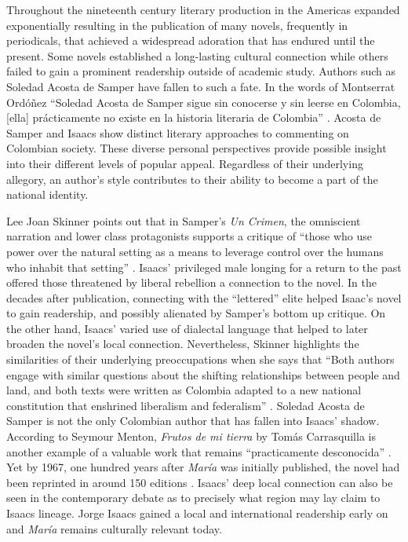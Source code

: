 \documentclass[12pt]{report}\usepackage[]{graphicx}\usepackage[]{color}
\begin{document}
\begin{spacing}{1.9}
Throughout the nineteenth century literary production in the Americas expanded exponentially resulting in the publication of many novels, frequently in periodicals, that achieved a widespread adoration that has endured until the present. 
Some novels established a long-lasting cultural connection while others failed to gain a prominent readership outside of academic study. 
Authors such as Soledad Acosta de Samper have fallen to such a fate. 
In the words of Montserrat Ordóñez \enquote{Soledad Acosta de Samper sigue sin conocerse y sin leerse en Colombia, [ella] prácticamente no existe en la historia literaria de Colombia} \autocite[257]{Ordonez2005}. 
Acosta de Samper and Isaacs show distinct literary approaches to commenting on Colombian society.
These diverse personal perspectives provide possible insight into their different levels of popular appeal.
Regardless of their underlying allegory, an author’s style contributes to their ability to become a part of the national identity. 

Lee Joan Skinner points out that in Samper's \textit{Un Crimen}, the omniscient narration and lower class protagonists supports a critique of  \enquote{those who use power over the natural setting as a means to leverage control over the humans who inhabit that setting} \autocite[19]{Skinner2014}.
Isaacs’ privileged male longing for a return to the past offered those threatened by liberal rebellion a connection to the novel.
In the decades after publication, connecting with the \enquote{lettered} elite helped Isaac's novel to gain readership, and possibly alienated by Samper's bottom up critique.
On the other hand, Isaacs’ varied use of dialectal language that helped to later broaden the novel's local connection. 
Nevertheless, Skinner highlights the similarities of their underlying preoccupations when she says that \enquote{Both authors engage with similar questions about the shifting relationships between people and land, and both texts were written as Colombia adapted to a new national constitution that enshrined liberalism and federalism} \autocite[13]{Skinner2014}.
Soledad Acosta de Samper is not the only Colombian author that has fallen into Isaacs' shadow.
According to Seymour Menton, \textit{Frutos de mi tierra} by Tomás Carrasquilla is another example of a valuable work that remains \enquote{practicamente desconocida} \autocite[111]{Menton1978}. 
Yet by 1967, one hundred years after \textit{María} was initially published, the novel had been reprinted in around 150 editions \autocite[13]{McGrady2012}. 
Isaacs' deep local connection can also be seen in the contemporary debate as to precisely what region may lay claim to Isaacs lineage. 
Jorge Isaacs gained a local and international readership early on and \textit{María} remains culturally relevant today. 



\end{spacing}
\end{document}
